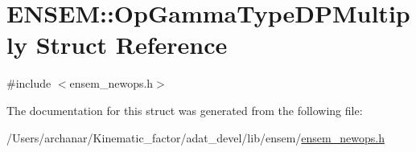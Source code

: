 \hypertarget{structENSEM_1_1OpGammaTypeDPMultiply}{}\section{E\+N\+S\+EM\+:\+:Op\+Gamma\+Type\+D\+P\+Multiply Struct Reference}
\label{structENSEM_1_1OpGammaTypeDPMultiply}


{\ttfamily \#include $<$ensem\+\_\+newops.\+h$>$}



The documentation for this struct was generated from the following file\+:\begin{DoxyCompactItemize}
\item 
/\+Users/archanar/\+Kinematic\+\_\+factor/adat\+\_\+devel/lib/ensem/\mbox{\hyperlink{lib_2ensem_2ensem__newops_8h}{ensem\+\_\+newops.\+h}}\end{DoxyCompactItemize}
